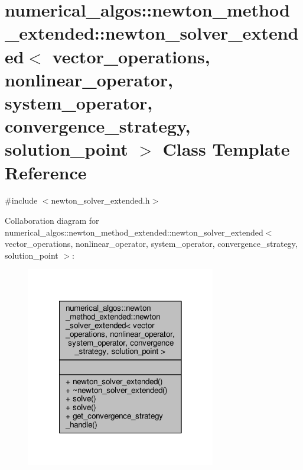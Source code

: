 \hypertarget{classnumerical__algos_1_1newton__method__extended_1_1newton__solver__extended}{\section{numerical\-\_\-algos\-:\-:newton\-\_\-method\-\_\-extended\-:\-:newton\-\_\-solver\-\_\-extended$<$ vector\-\_\-operations, nonlinear\-\_\-operator, system\-\_\-operator, convergence\-\_\-strategy, solution\-\_\-point $>$ Class Template Reference}
\label{classnumerical__algos_1_1newton__method__extended_1_1newton__solver__extended}
}


{\ttfamily \#include $<$newton\-\_\-solver\-\_\-extended.\-h$>$}



Collaboration diagram for numerical\-\_\-algos\-:\-:newton\-\_\-method\-\_\-extended\-:\-:newton\-\_\-solver\-\_\-extended$<$ vector\-\_\-operations, nonlinear\-\_\-operator, system\-\_\-operator, convergence\-\_\-strategy, solution\-\_\-point $>$\-:
\nopagebreak
\begin{figure}[H]
\begin{center}
\leavevmode
\includegraphics[width=234pt]{classnumerical__algos_1_1newton__method__extended_1_1newton__solver__extended__coll__graph}
\end{center}
\end{figure}

